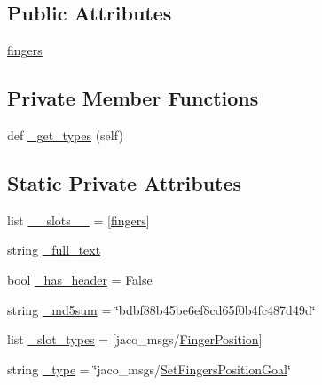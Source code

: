 \subsection*{Public Attributes}
\begin{DoxyCompactItemize}
\item 
\hyperlink{classjaco__msgs_1_1msg_1_1__SetFingersPositionGoal_1_1SetFingersPositionGoal_ab7578aa64d5376794159263ab55d0543}{fingers}
\end{DoxyCompactItemize}
\subsection*{Private Member Functions}
\begin{DoxyCompactItemize}
\item 
def \hyperlink{classjaco__msgs_1_1msg_1_1__SetFingersPositionGoal_1_1SetFingersPositionGoal_a5ddedb1c8f514c50ff34122d2783e0d5}{\+\_\+get\+\_\+types} (self)
\end{DoxyCompactItemize}
\subsection*{Static Private Attributes}
\begin{DoxyCompactItemize}
\item 
list \hyperlink{classjaco__msgs_1_1msg_1_1__SetFingersPositionGoal_1_1SetFingersPositionGoal_aa1727dd78b4c53634daa35b070492917}{\+\_\+\+\_\+slots\+\_\+\+\_\+} = \mbox{[}\textquotesingle{}\hyperlink{classjaco__msgs_1_1msg_1_1__SetFingersPositionGoal_1_1SetFingersPositionGoal_ab7578aa64d5376794159263ab55d0543}{fingers}\textquotesingle{}\mbox{]}
\item 
string \hyperlink{classjaco__msgs_1_1msg_1_1__SetFingersPositionGoal_1_1SetFingersPositionGoal_a8d65a11619bd19524cb5ea6011d21f21}{\+\_\+full\+\_\+text}
\item 
bool \hyperlink{classjaco__msgs_1_1msg_1_1__SetFingersPositionGoal_1_1SetFingersPositionGoal_a0443135d5af57a06bb17d1276690b92b}{\+\_\+has\+\_\+header} = False
\item 
string \hyperlink{classjaco__msgs_1_1msg_1_1__SetFingersPositionGoal_1_1SetFingersPositionGoal_ae965a80450e5ae3404ef3d04af2d8b95}{\+\_\+md5sum} = \char`\"{}bdbf88b45be6ef8cd65f0b4fc487d49d\char`\"{}
\item 
list \hyperlink{classjaco__msgs_1_1msg_1_1__SetFingersPositionGoal_1_1SetFingersPositionGoal_acfd6f44f947c849c08bf77889b47ee1f}{\+\_\+slot\+\_\+types} = \mbox{[}\textquotesingle{}jaco\+\_\+msgs/\hyperlink{classjaco__msgs_1_1msg_1_1__FingerPosition_1_1FingerPosition}{Finger\+Position}\textquotesingle{}\mbox{]}
\item 
string \hyperlink{classjaco__msgs_1_1msg_1_1__SetFingersPositionGoal_1_1SetFingersPositionGoal_af65c7bdf9a8116c1b309bd0d844c9b90}{\+\_\+type} = \char`\"{}jaco\+\_\+msgs/\hyperlink{classjaco__msgs_1_1msg_1_1__SetFingersPositionGoal_1_1SetFingersPositionGoal}{Set\+Fingers\+Position\+Goal}\char`\"{}
\end{DoxyCompactItemize}


